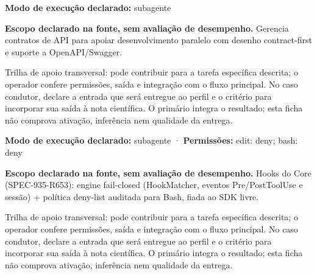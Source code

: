 \begin{arquitetura}
\textbf{Modo de execução declarado:} subagente
\end{arquitetura}


\begin{descricao}
\textbf{Escopo declarado na fonte, sem avaliação de desempenho.}
Gerencia contratos de API para apoiar desenvolvimento paralelo com desenho contract-first e suporte a OpenAPI/Swagger.
\end{descricao}

\begin{funcao}
Trilha de apoio transversal: pode contribuir para a tarefa específica descrita; o operador confere permissões, saída e integração com o fluxo principal. No caso condutor, declare a entrada que será entregue ao perfil e o critério para incorporar sua saída à nota científica. O primário integra o resultado; esta ficha não comprova ativação, inferência nem qualidade da entrega.
\end{funcao}

\begin{arquitetura}
\textbf{Modo de execução declarado:} subagente · \textbf{Permissões:} edit: deny; bash: deny
\end{arquitetura}


\begin{descricao}
\textbf{Escopo declarado na fonte, sem avaliação de desempenho.}
Hooks do Core (SPEC-935-R653): engine fail-closed (HookMatcher, eventos Pre/PostToolUse e sessão) + política deny-list auditada para Bash, fiada ao SDK livre.
\end{descricao}

\begin{funcao}
Trilha de apoio transversal: pode contribuir para a tarefa específica descrita; o operador confere permissões, saída e integração com o fluxo principal. No caso condutor, declare a entrada que será entregue ao perfil e o critério para incorporar sua saída à nota científica. O primário integra o resultado; esta ficha não comprova ativação, inferência nem qualidade da entrega.
\end{funcao}

